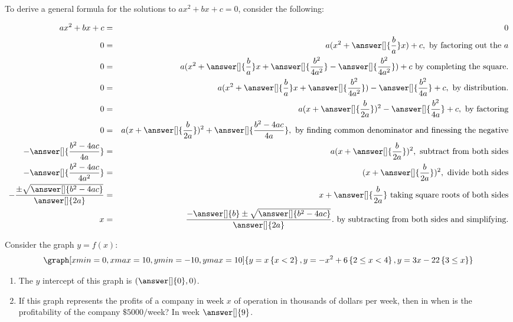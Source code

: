 \documentclass{ximera}
\begin{document}
\begin{question}

To derive a general formula for the solutions to $ax^2+bx+c=0$, consider the following:

\begin{eqnarray*}
ax^2+bx+c&=& 0\\
0&=&a(x^2+\answer[]{\frac{b}{a}}x)+c,\ \text{by factoring out the $a$} \\
0&=& a(x^2+\answer[]{\frac{b}{a}}x+\answer[]{\frac{b^2}{4a^2}}-\answer[]{\frac{b^2}{4a^2}})+c \ \text{by completing the square.}\\
0&=&a(x^2+\answer[]{\frac{b}{a}}x+\answer[]{\frac{b^2}{4a^2}})-\answer[]{\frac{b^2}{4a}}+c, \ \text{by distribution.}\\
0&=&a(x+\answer[]{\frac{b}{2a}})^2-\answer[]{\frac{b^2}{4a}}+c,\ \text{by factoring}\\
0&=&a(x+\answer[]{\frac{b}{2a}})^2+\answer[]{\frac{b^2-4ac}{4a}},\ \text{by finding common denominator and finessing the negative}\\
-\answer[]{\frac{b^2-4ac}{4a}}&=&a(x+\answer[]{\frac{b}{2a}})^2, \ \text{subtract from both sides}\\
-\answer[]{\frac{b^2-4ac}{4a^2}}&=&(x+\answer[]{\frac{b}{2a}})^2, \ \text{divide both sides}\\
-\frac{\pm \sqrt{\answer[]{b^2-4ac}}}{\answer[]{2a}}&=&x+\answer[]{\frac{b}{2a}}\ \text{taking square roots of both sides}\\
x&=&\frac{-\answer[]{b}\pm \sqrt{\answer[]{b^2-4ac}}}{\answer[]{2a}}.\ \text{by subtracting from both sides and simplifying.}
\end{eqnarray*}


\end{question}


\begin{question}

 \begin{onlineOnly}
   Consider the graph $y=f(x)$:
   \[
   \graph[xmin=0,xmax=10,ymin=-10,ymax=10]{y=x\left\{x<2\right\},y=-x^2+6\left\{2\leq x<4\right\},y=3x-22\left\{3 \leq x\right\}} 
   \]
 \end{onlineOnly}

\begin{enumerate}
\item The $y$ intercept of this graph is $(\answer[]{0},0)$.
\item If this graph represents the profits of a company in week $x$ of operation in thousands of dollars per week, then in when is the profitability of the company $\$5000/$week?  In week $\answer[]{9}$.
\end{enumerate}



\end{question}
\end{document}
